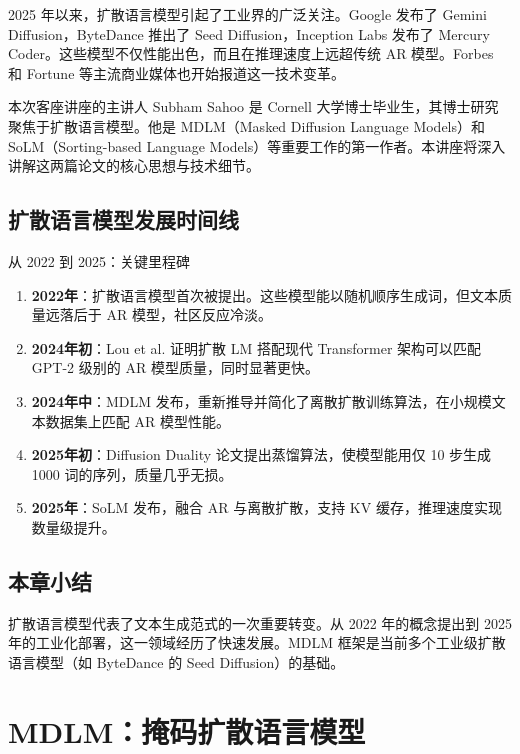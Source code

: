 \documentclass[a4paper]{article}
\begin{document}
2025 年以来，扩散语言模型引起了工业界的广泛关注。Google 发布了 Gemini Diffusion，ByteDance 推出了 Seed Diffusion，Inception Labs 发布了 Mercury Coder。这些模型不仅性能出色，而且在推理速度上远超传统 AR 模型。Forbes 和 Fortune 等主流商业媒体也开始报道这一技术变革。

本次客座讲座的主讲人 Subham Sahoo 是 Cornell 大学博士毕业生，其博士研究聚焦于扩散语言模型。他是 MDLM（Masked Diffusion Language Models）和 SoLM（Sorting-based Language Models）等重要工作的第一作者。本讲座将深入讲解这两篇论文的核心思想与技术细节。

\subsection{扩散语言模型发展时间线}

\begin{knowledgebox}{从 2022 到 2025：关键里程碑}
\begin{enumerate}
    \item \textbf{2022年}：扩散语言模型首次被提出。这些模型能以随机顺序生成词，但文本质量远落后于 AR 模型，社区反应冷淡。
    \item \textbf{2024年初}：Lou et al. 证明扩散 LM 搭配现代 Transformer 架构可以匹配 GPT-2 级别的 AR 模型质量，同时显著更快。
    \item \textbf{2024年中}：MDLM 发布，重新推导并简化了离散扩散训练算法，在小规模文本数据集上匹配 AR 模型性能。
    \item \textbf{2025年初}：Diffusion Duality 论文提出蒸馏算法，使模型能用仅 10 步生成 1000 词的序列，质量几乎无损。
    \item \textbf{2025年}：SoLM 发布，融合 AR 与离散扩散，支持 KV 缓存，推理速度实现数量级提升。
\end{enumerate}
\end{knowledgebox}

\subsection{本章小结}

扩散语言模型代表了文本生成范式的一次重要转变。从 2022 年的概念提出到 2025 年的工业化部署，这一领域经历了快速发展。MDLM 框架是当前多个工业级扩散语言模型（如 ByteDance 的 Seed Diffusion）的基础。

\newpage
\section{MDLM：掩码扩散语言模型}
\end{document}
